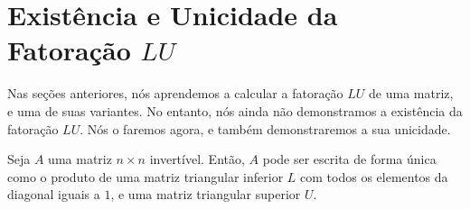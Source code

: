 \section{Existência e Unicidade da Fatoração \texorpdfstring{$LU$}{LU}}

Nas seções anteriores, nós aprendemos a calcular a fatoração $LU$ de uma matriz, e uma de suas variantes. No entanto, nós ainda não demonstramos a existência da fatoração $LU$. Nós o faremos agora, e também demonstraremos a sua unicidade.

\begin{Theorem}
	Seja $A$ uma matriz $n\times n$ invertível. Então, $A$ pode ser escrita de forma única como o produto de uma matriz triangular inferior $L$ com todos os elementos da diagonal iguais a $1$, e uma matriz triangular superior $U$.
\end{Theorem}

